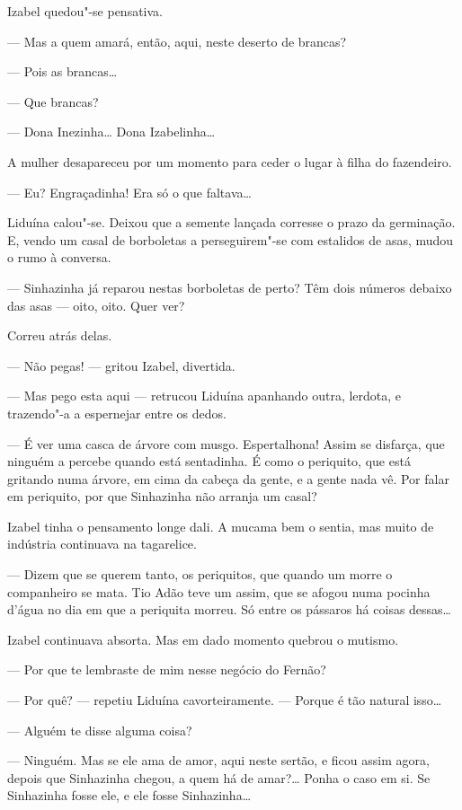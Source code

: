 Izabel quedou"-se pensativa.

--- Mas a quem amará, então, aqui, neste deserto de brancas?

--- Pois as brancas\ldots{}

--- Que brancas?

--- Dona Inezinha\ldots{} Dona Izabelinha\ldots{}

A mulher desapareceu por um momento para ceder o lugar à filha do
fazendeiro.

--- Eu? Engraçadinha! Era só o que faltava\ldots{}

Liduína calou"-se. Deixou que a semente lançada corresse o prazo da
germinação. E, vendo um casal de borboletas a perseguirem"-se com
estalidos de asas, mudou o rumo à conversa.

--- Sinhazinha já reparou nestas borboletas de perto? Têm dois números
debaixo das asas --- oito, oito. Quer ver?

Correu atrás delas.

--- Não pegas! --- gritou Izabel, divertida.

--- Mas pego esta aqui --- retrucou Liduína apanhando outra, lerdota, e
trazendo"-a a espernejar entre os dedos.

--- É ver uma casca de árvore com musgo. Espertalhona! Assim se
disfarça, que ninguém a percebe quando está sentadinha. É como o
periquito, que está gritando numa árvore, em cima da cabeça da gente, e
a gente nada vê. Por falar em periquito, por que Sinhazinha não arranja
um casal?

Izabel tinha o pensamento longe dali. A mucama bem o sentia, mas muito
de indústria continuava na tagarelice.

--- Dizem que se querem tanto, os periquitos, que quando um morre o
companheiro se mata. Tio Adão teve um assim, que se afogou numa pocinha
d'água no dia em que a periquita morreu. Só entre os pássaros há coisas
dessas\ldots{}

Izabel continuava absorta. Mas em dado momento quebrou o mutismo.

--- Por que te lembraste de mim nesse negócio do Fernão?

--- Por quê? --- repetiu Liduína cavorteiramente. --- Porque é tão
natural isso\ldots{}

--- Alguém te disse alguma coisa?

--- Ninguém. Mas se ele ama de amor, aqui neste sertão, e ficou assim
agora, depois que Sinhazinha chegou, a quem há de amar?\ldots{} Ponha o caso
em si. Se Sinhazinha fosse ele, e ele fosse Sinhazinha\ldots{}

